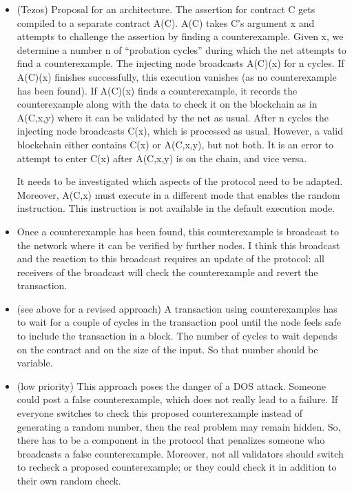 \documentclass{article}
\begin{document}
\begin{itemize}
\item (Tezos) Proposal for an architecture. The assertion for contract C gets compiled
  to a separate contract A(C). A(C) takes C's argument x and attempts to challenge 
  the assertion by finding a counterexample. Given x, we determine a number n of
  ``probation cycles'' during which the net attempts to find a counterexample. The
  injecting node broadcasts A(C)(x) for n cycles. If A(C)(x) finishes successfully,
  this execution vanishes (as no counterexample has been found). If A(C)(x) finds a
  counterexample, it records the counterexample along with the data to check it on the
  blockchain as in A(C,x,y) where it can be validated by the net as usual.
  After n cycles the injecting node broadcasts C(x), which is processed as
  usual. However, a valid blockchain either contains C(x) or A(C,x,y), but not both. It
  is an error to attempt to enter C(x) after A(C,x,y) is on the chain, and vice versa.

  It needs to be investigated which aspects of the protocol need to be
  adapted. Moreover, A(C,x) must execute in a different mode that enables the random
  instruction. This instruction is not available in the default execution mode.
\item   Once a counterexample has been found,
  this counterexample is broadcast to the network where it can be verified by further
  nodes.  I think this broadcast and the reaction to this broadcast requires an update of
  the protocol: all receivers of the broadcast will check the counterexample and revert
  the transaction. 
\item (see above for a revised approach) A transaction using counterexamples has to
  wait for a couple of cycles in the transaction pool until the node feels safe to
  include the transaction in a block.
  The number of cycles to wait depends on the contract and on the size of the input.
  So that number should be variable.
\item (low priority) This approach poses the danger of a DOS attack. Someone could post a false
  counterexample, which does not really lead to a failure. If everyone switches to
  check this proposed counterexample instead of generating a random number, then the
  real problem may remain hidden. So, there has to be a component in the protocol that
  penalizes someone who broadcasts a false counterexample. Moreover, not all validators
  should switch to recheck a proposed counterexample; or they could check it in
  addition to their own random check.


\end{itemize}
\end{document}
